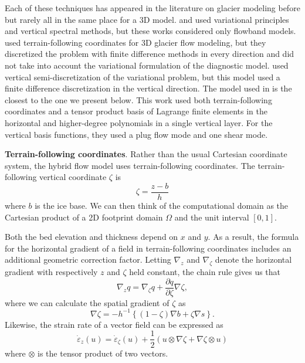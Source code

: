 \documentclass[journal abbreviation, manuscript]{copernicus}
\begin{document}
Each of these techniques has appeared in the literature on glacier modeling before but rarely all in the same place for a 3D model.
\citet{langdon1978numerical} and \cite{bassis2010hamilton} used variational principles and vertical spectral methods, but these works considered only flowband models.
\citet{kleiner2014numerical} used terrain-following coordinates for 3D glacier flow modeling, but they discretized the problem with finite difference methods in every direction and did not take into account the variational formulation of the diagnostic model.
\citet{jouvet2015multilayer} used vertical semi-discretization of the variational problem, but this model used a finite difference discretization in the vertical direction.
The model used in \citet{brinkerhoff2015dynamics} is the closest to the one we present below.
This work used both terrain-following coordinates and a tensor product basis of Lagrange finite elements in the horizontal and higher-degree polynomials in a single vertical layer.
For the vertical basis functions, they used a plug flow mode and one shear mode.

\textbf{Terrain-following coordinates}.
Rather than the usual Cartesian coordinate system, the hybrid flow model uses terrain-following coordinates.
The terrain-following vertical coordinate $\zeta$ is
\begin{equation}
    \zeta = \frac{z - b}{h}
\end{equation}
where $b$ is the ice base.
We can then think of the computational domain as the Cartesian product of a 2D footprint domain $\Omega$ and the unit interval $[0, 1]$.

Both the bed elevation and thickness depend on $x$ and $y$.
As a result, the formula for the horizontal gradient of a field in terrain-following coordinates includes an additional geometric correction factor.
Letting $\nabla_z$ and $\nabla_\zeta$ denote the horizontal gradient with respectively $z$ and $\zeta$ held constant, the chain rule gives us that
\begin{equation}
    \nabla_zq = \nabla_\zeta q + \frac{\partial q}{\partial\zeta}\nabla\zeta,
\end{equation}
where we can calculate the spatial gradient of $\zeta$ as
\begin{equation}
    \nabla\zeta = -h^{-1}\left\{(1 - \zeta)\nabla b + \zeta\nabla s\right\}.
\end{equation}
Likewise, the strain rate of a vector field can be expressed as
\begin{equation}
    \dot\varepsilon_z(u) = \dot\varepsilon_\zeta(u) + \frac{1}{2}\left(u \otimes\nabla\zeta + \nabla\zeta\otimes u\right)
    \label{eq:geometric-correction}
\end{equation}
where $\otimes$ is the tensor product of two vectors.
\end{document}
